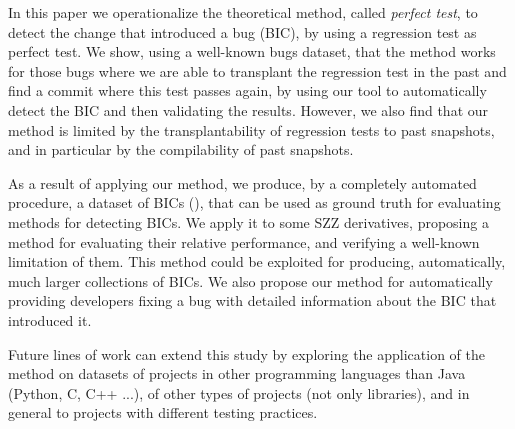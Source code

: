 


In this paper we operationalize the theoretical method, called \emph{perfect test}, to detect the change that introduced a bug (BIC), by using a regression test as perfect test. We show, using a well-known bugs dataset, that the method works for those bugs where we are able to transplant the regression test in the past and find a commit where this test passes again, by using our tool to automatically detect the BIC and then validating the results. 
However, we also find that our method is limited by the transplantability of regression tests to past snapshots, and in particular by the compilability of past snapshots.

As a result of applying our method, we produce, by a completely automated procedure, a dataset of BICs (\datasetName), that can be used as ground truth for evaluating methods for detecting BICs. 
We apply it to some SZZ derivatives, proposing a method for evaluating their relative performance, and verifying a well-known limitation of them. 
This method could be exploited for producing, automatically, much larger collections of BICs. 
We also propose our method for automatically providing developers fixing a bug with detailed information about the BIC that introduced it.

Future lines of work can extend this study by exploring the application of the method on datasets of projects in other programming languages than Java (Python, C, C++ ...), of other types of projects (not only libraries), and in general to projects with different testing practices.
